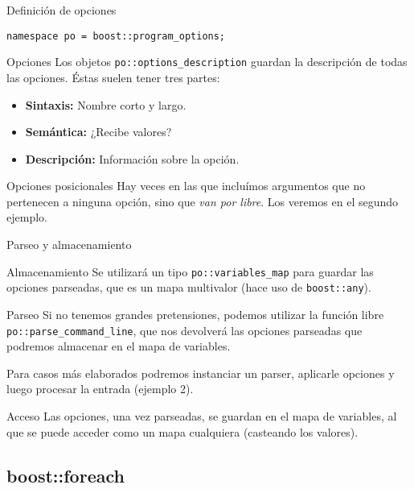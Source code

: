 \documentclass[8pt,xcolor=svgnames]{beamer}
\begin{document}
\begin{frame}{Definición de opciones}
  \begin{block}{}
    \texttt{namespace po = boost::program\_options;}
  \end{block}
  \begin{block}{Opciones}
    Los objetos \texttt{po::options\_description} guardan la
    descripción de todas las opciones. Éstas suelen tener tres partes:
    \begin{itemize}
    \item \textbf{Sintaxis:} Nombre corto y largo.
    \item \textbf{Semántica:} ¿Recibe valores?
    \item \textbf{Descripción:} Información sobre la opción.
    \end{itemize}
  \end{block}
  \pause
  \begin{block}{Opciones posicionales}
    Hay veces en las que incluímos argumentos que no pertenecen a
    ninguna opción, sino que \textit{van por libre}. Los veremos en el
    segundo ejemplo.
  \end{block}
\end{frame}

\begin{frame}{Parseo y almacenamiento}
  \begin{block}{Almacenamiento}
    Se utilizará un tipo \texttt{po::variables\_map} para guardar las
    opciones parseadas, que es un mapa multivalor (hace uso de
    \texttt{boost::any}).
  \end{block}
  \pause
  \begin{block}{Parseo}
    Si no tenemos grandes pretensiones, podemos utilizar la función
    libre \texttt{po::parse\_command\_line}, que nos devolverá las
    opciones parseadas que podremos almacenar en el mapa de variables.

    Para casos más elaborados podremos instanciar un parser, aplicarle
    opciones y luego procesar la entrada (ejemplo 2).
  \end{block}
  \pause
  \begin{block}{Acceso}
    Las opciones, una vez parseadas, se guardan en el mapa de
    variables, al que se puede acceder como un mapa cualquiera
    (casteando los valores).
  \end{block}
\end{frame}

\subsection{boost::foreach}
\end{document}
